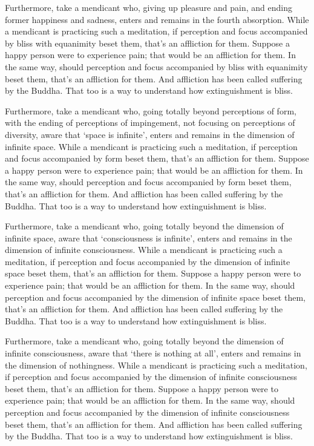 \documentclass[12pt,openany]{book}%
\begin{document}
Furthermore, take a mendicant who, giving up pleasure and pain, and ending former happiness and sadness, enters and remains in the fourth absorption. While a mendicant is practicing such a meditation, if perception and focus accompanied by bliss with equanimity beset them, that’s an affliction for them. Suppose a happy person were to experience pain; that would be an affliction for them. In the same way, should perception and focus accompanied by bliss with equanimity beset them, that’s an affliction for them. And affliction has been called suffering by the Buddha. That too is a way to understand how extinguishment is bliss. 

Furthermore, take a mendicant who, going totally beyond perceptions of form, with the ending of perceptions of impingement, not focusing on perceptions of diversity, aware that ‘space is infinite’, enters and remains in the dimension of infinite space. While a mendicant is practicing such a meditation, if perception and focus accompanied by form beset them, that’s an affliction for them. Suppose a happy person were to experience pain; that would be an affliction for them. In the same way, should perception and focus accompanied by form beset them, that’s an affliction for them. And affliction has been called suffering by the Buddha. That too is a way to understand how extinguishment is bliss. 

Furthermore, take a mendicant who, going totally beyond the dimension of infinite space, aware that ‘consciousness is infinite’, enters and remains in the dimension of infinite consciousness. While a mendicant is practicing such a meditation, if perception and focus accompanied by the dimension of infinite space beset them, that’s an affliction for them. Suppose a happy person were to experience pain; that would be an affliction for them. In the same way, should perception and focus accompanied by the dimension of infinite space beset them, that’s an affliction for them. And affliction has been called suffering by the Buddha. That too is a way to understand how extinguishment is bliss. 

Furthermore, take a mendicant who, going totally beyond the dimension of infinite consciousness, aware that ‘there is nothing at all’, enters and remains in the dimension of nothingness. While a mendicant is practicing such a meditation, if perception and focus accompanied by the dimension of infinite consciousness beset them, that’s an affliction for them. Suppose a happy person were to experience pain; that would be an affliction for them. In the same way, should perception and focus accompanied by the dimension of infinite consciousness beset them, that’s an affliction for them. And affliction has been called suffering by the Buddha. That too is a way to understand how extinguishment is bliss. 
\end{document}
